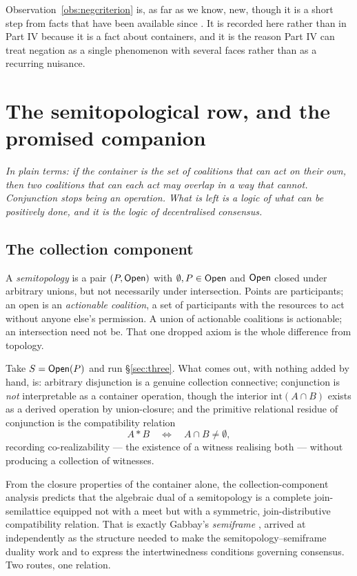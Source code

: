 Observation~\ref{obs:negcriterion} is, as far as we know, new, though it is a
short step from facts that have been available since \cite{Yetter90}. It is
recorded here rather than in Part IV because it is a fact about containers, and it
is the reason Part IV can treat negation as a single phenomenon with several
faces rather than as a recurring nuisance.

\section{The semitopological row, and the promised companion}
\label{sec:semitop}

\noindent\emph{In plain terms: if the container is the set of coalitions that can
act on their own, then two coalitions that can each act may overlap in a way that
cannot. Conjunction stops being an operation. What is left is a logic of what can
be positively done, and it is the logic of decentralised consensus.}

\subsection{The collection component}

A \emph{semitopology} \cite{Gabbay25} is a pair $(P,\mathsf{Open})$ with
$\emptyset, P \in \mathsf{Open}$ and $\mathsf{Open}$ closed under arbitrary unions, but not
necessarily under intersection. Points are participants; an open is an
\emph{actionable coalition}, a set of participants with the resources to act
without anyone else's permission. A union of actionable coalitions is actionable;
an intersection need not be. That one dropped axiom is the whole difference from
topology.

Take $S = \mathsf{Open}(P)$ and run \S\ref{sec:three}. What comes out, with nothing
added by hand, is: arbitrary disjunction is a genuine collection connective;
conjunction is \emph{not} interpretable as a container operation, though the
interior $\mathrm{int}(A \cap B)$ exists as a derived operation by union-closure;
and the primitive relational residue of conjunction is the compatibility relation
\[
  A \ast B \quad\Longleftrightarrow\quad A \cap B \neq \emptyset,
\]
recording co-realizability --- the existence of a witness realising both --- without
producing a collection of witnesses.

\begin{observation}
\label{obs:semiframe}
From the closure properties of the container alone, the collection-component
analysis predicts that the algebraic dual of a semitopology is a complete
join-semilattice equipped not with a meet but with a symmetric, join-distributive
compatibility relation. That is exactly Gabbay's \emph{semiframe}
\cite{GabbaySemiframes}, arrived at independently as the structure needed to make
the semitopology--semiframe duality work and to express the intertwinedness
conditions governing consensus. Two routes, one relation.
\end{observation}

